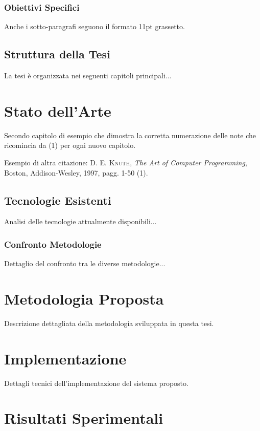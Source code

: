 \documentclass[12pt,a4paper,oneside]{book}
\newcommand{\autore}[1]{\textsc{#1}}
\newcommand{\citlibro}[6]{%
    \autore{#1}, \textit{#2}, #3, #4, #5, pagg. #6%
}
\begin{document}
\subsection{Obiettivi Specifici}

Anche i sotto-paragrafi seguono il formato 11pt grassetto.

\section{Struttura della Tesi}

La tesi è organizzata nei seguenti capitoli principali...

\chapter{Stato dell'Arte}

Secondo capitolo di esempio che dimostra la corretta numerazione delle note che ricomincia da (1) per ogni nuovo capitolo.

Esempio di altra citazione: \citlibro{D. E. Knuth}{The Art of Computer Programming}{Boston}{Addison-Wesley}{1997}{1-50}(1).

\section{Tecnologie Esistenti}

Analisi delle tecnologie attualmente disponibili...

\subsection{Confronto Metodologie}

Dettaglio del confronto tra le diverse metodologie...

\chapter{Metodologia Proposta}

Descrizione dettagliata della metodologia sviluppata in questa tesi.

\chapter{Implementazione}

Dettagli tecnici dell'implementazione del sistema proposto.

\chapter{Risultati Sperimentali}
\end{document}
